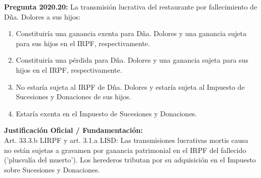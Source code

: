 \documentclass[11pt,a4paper,openany]{article}
\begin{document}
\noindent\textbf{\sffamily Pregunta 2020.20:} La transmisión lucrativa del restaurante por fallecimiento de Dña. Dolores a sus hijos:\\[0.15cm]
\begin{enumerate}[label=\textbf{\alph*)},leftmargin=1.8em,itemsep=1.5pt,topsep=2pt,partopsep=0pt,parsep=0pt]
    \item Constituiría una ganancia exenta para Dña. Dolores y una ganancia sujeta para sus hijos en el IRPF, respectivamente.
    \item Constituiría una pérdida para Dña. Dolores y una ganancia sujeta para sus hijos en el IRPF, respectivamente.
    \item No estaría sujeta al IRPF de Dña. Dolores y estaría sujeta al Impuesto de Sucesiones y Donaciones de sus hijos.
    \item Estaría exenta en el Impuesto de Sucesiones y Donaciones.
\end{enumerate}
\begin{solucionBox}
\textbf{Justificación Oficial / Fundamentación:}\\[0.1cm]
Art. 33.3.b LIRPF y art. 3.1.a LISD: Las transmisiones lucrativas mortis causa no están sujetas a gravamen por ganancia patrimonial en el IRPF del fallecido ('plusvalía del muerto'). Los herederos tributan por su adquisición en el Impuesto sobre Sucesiones y Donaciones.
\end{solucionBox}
\vspace{0.35cm}
\end{document}
